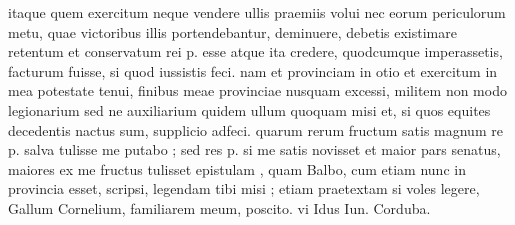  itaque quem exercitum neque vendere ullis praemiis volui nec eorum periculorum metu, quae victoribus illis portendebantur, deminuere, debetis existimare retentum et conservatum rei p. esse atque ita credere, quodcumque imperassetis, facturum fuisse, si quod iussistis feci. nam et provinciam in otio et exercitum in mea potestate tenui, finibus meae provinciae nusquam excessi, militem non modo legionarium sed ne auxiliarium quidem ullum quoquam misi et, si quos equites decedentis nactus sum, supplicio adfeci. quarum rerum fructum satis magnum re p. salva tulisse me putabo ; sed res p. si me satis novisset et maior pars senatus, maiores ex me fructus tulisset epistulam , quam Balbo, cum etiam nunc in provincia esset, scripsi, legendam tibi misi ; etiam praetextam si voles legere, Gallum Cornelium, familiarem meum, poscito. vi Idus Iun. Corduba.
